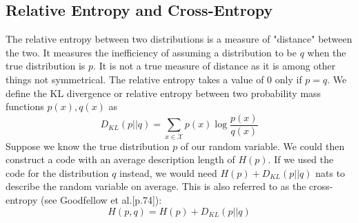 \subsection{Relative Entropy and Cross-Entropy}
The relative entropy between two distributions is a measure of "distance" between the two. It measures the inefficiency of assuming a distribution to be $q$ when the true distribution is $p$. It is not a true measure of distance as it is among other things not symmetrical. The relative entropy takes a value of $0$ only if $p = q$.
We define the KL divergence or relative entropy between two probability mass functions $p(x), q(x)$ as
\begin{equation}
    D_{KL}(p||q) = \sum_{x \in \mathcal{X}} p(x)\log \frac{p(x)}{q(x)}
\end{equation}
Suppose we know the true distribution $p$ of our random variable. We could then construct a code with an average description length of $H(p)$. If we used the code for the distribution $q$ instead, we would need $H(p) + D_{KL}(p||q)$ nats to describe the random variable on average. This is also referred to as the cross-entropy (see Goodfellow et al.\cite{Goodfellow-et-al-2016}[p.74]):
\begin{equation}
    H(p,q) =  H(p) + D_{KL}(p||q)
\end{equation}



